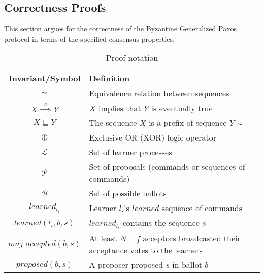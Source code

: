 \subsection{Correctness Proofs}

This section argues for the correctness of the Byzantine Generalized Paxos protocol in terms of the specified consensus properties.\par


\begin{table}[h!]
	\renewcommand{\arraystretch}{1.5}
	\centering
	\begin{tabularx}{\linewidth}{ |c|X|}
		\hline
		Invariant/Symbol & Definition \\
		\hline
		$\thicksim$ & Equivalence relation between sequences \\
		\hline
		$X \overset{e}{\implies} Y$ & $X$ implies that $Y$ is eventually true \\
		\hline
		$X \sqsubseteq Y$ & The sequence $X$ is a prefix of sequence $Y$ $\thicksim$ \\
		\hline
		$\oplus$ & Exclusive OR (XOR) logic operator \\
		\hline
		$\mathcal{L}$ & Set of learner processes \\
		\hline
		$\mathcal{P}$ & Set of proposals (commands or sequences of commands) \\
		\hline
		$\mathcal{B}$ & Set of possible ballots \\
		\hline
		$learned_{l_i}$ & Learner $l_i$'s $learned$ sequence of commands \\
		\hline
		$learned(l_i,b,s)$ & $learned_{l_i}$ contains the sequence $s$\\
		\hline
		$maj\_accepted(b,s)$ & At least $N-f$ acceptors broadcasted their acceptance votes to the learners\\
		\hline
		$proposed(b,s)$ & A proposer proposed $s$ in ballot $b$ \\
		\hline
		
  	\end{tabularx} 
	\caption{Proof notation} 
	\label{table:1}
\end{table}

